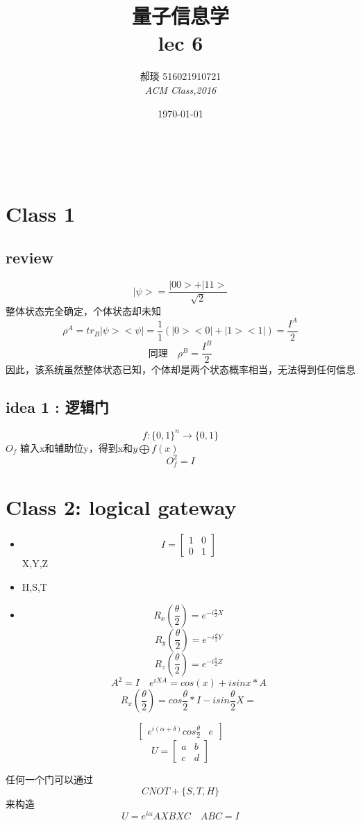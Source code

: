 \documentclass[a4paper, 11pt]{article} %
\title{\textbf{量子信息学}\\ %
lec 6} %
\author{\textsc{郝琰 516021910721} %
\\{\textit{ACM Class,2016}}} %
\date{\today} %
\makeatletter
\renewcommand{\maketitle}{ %

\begin{flushright} %
{\LARGE\@title} %

\vspace{50pt} %

{\large\@author} %
\\\@date %

\vspace{10pt} %
\end{flushright}
}
\makeatother
\begin{document}
\maketitle
\section{Class 1}
\subsection{review}
$$
|\psi> = \frac{|00>+|11>}{\sqrt{2}}
$$
整体状态完全确定，个体状态却未知\\
$$
\rho^A = tr_B|\psi><\psi| = \frac{1}{1}(|0><0|+|1><1|) = \frac{I^A}{2}
$$
$$
\mbox{同理}\quad \rho^B = \frac{I^B}{2}
$$
因此，该系统虽然整体状态已知，个体却是两个状态概率相当，无法得到任何信息
\subsection{idea 1 : 逻辑门}
$$
f : \lbrace0,1\rbrace^n \rightarrow \lbrace0,1\rbrace
$$
$O_f$ 输入x和辅助位y，得到x和$y\bigoplus f(x)$
$$
O_f^2 = I
$$
\section{Class 2: logical gateway}
\begin{itemize}
	\item
	$$
 I = \left[
 \begin{matrix}
   1 & 0 \\
   0 & 1 
  \end{matrix}
  \right] 
$$
X,Y,Z
\item
H,S,T
\item
$$
R_x(\frac{\theta}{2}) = e^{-i\frac{\theta}{2}X}
$$
$$
R_y(\frac{\theta}{2}) = e^{-i\frac{\theta}{2}Y}
$$
$$
R_z(\frac{\theta}{2}) = e^{-i\frac{\theta}{2}Z}
$$
$$
A^2 = I \quad e^{iXA} = cos(x) + isinx * A
$$
$$
R_x(\frac{\theta}{2}) = cos\frac{\theta}{2}*I - isin\frac{\theta}{2}X = 
$$
\end{itemize}

$$
\left[
\begin{matrix}
e^{i(\alpha+\delta)}cos\frac{\theta}{2} & e^{}

\end{matrix}
\right]
$$
$$
U = \left[
\begin{matrix}
a & b \\
c & d 
\end{matrix}
\right]
$$

任何一个门可以通过
$$
CNOT + \lbrace S,T,H \rbrace
$$
来构造
$$
U = e^{i\alpha}AXBXC \quad ABC = I
$$
\end{document}
